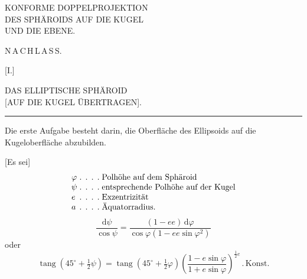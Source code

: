 \par\clearpage

\thispagestyle{empty}
\vspace*{\fill}
\begin{center}
\LARGE
KONFORME DOPPELPROJEKTION\\[.5ex]
DES SPHÄROIDS AUF DIE KUGEL\\[.5ex]
UND DIE EBENE.
\end{center}
\vspace*{\fill}

\par\clearpage

\thispagestyle{empty}
\null

\par\clearpage

\vspace*{.11\textheight}
\begin{center}{\LARGE N\,A\,C\,H\,L\,A\,S\,S.}\end{center}
\vspace{.05\textheight}
\begin{center}
[I.]\par\bigskip
{\Large DAS ELLIPTISCHE SPHÄROID\\
{[AUF DIE KUGEL ÜBERTRAGEN].}}\par\bigskip
\rule{.09\textwidth}{.4pt}\par\bigskip
[1.]
\end{center}

Die erste Aufgabe besteht darin, die Oberfläche des Ellipsoids auf
die Kugeloberfläche abzubilden.

[Es sei]
\[
\begin{array}{l@{\;\ldotp\;\ldotp\;\ldotp\;\ldotp\;}l}
\varphi & \text{Polhöhe auf dem Sphäroid}\\
\psi & \text{entsprechende Polhöhe auf der Kugel}\\
e & \text{Exzentrizität}\\
a & \text{Äquatorradius.}
\end{array}
\]
\[
\frac{\mathrm d\psi}{\cos\psi}
=\frac{(1-ee)\,\mathrm d\varphi}{\cos\varphi(1-ee\sin\varphi^2)}
\]
\noindent oder
\[
\operatorname{tang}(45^\circ+\tfrac12\psi)
=\operatorname{tang}(45^\circ+\tfrac12\varphi)
\left(\frac{1-e\sin\varphi}{1+e\sin\varphi}\right)^{\frac12 e}\,.\,\text{Konst.}
\]

